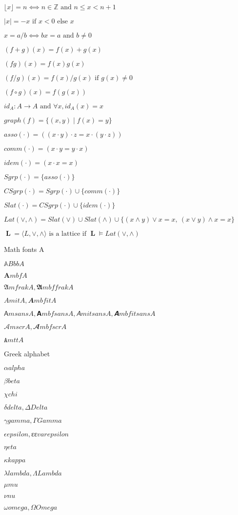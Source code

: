 \documentclass{article}
\begin{document}
$⌊x⌋ = n ⟺ n ∈ ℤ \text{ and } n ≤ x < n+1$

$|x| = −x \text{ if } x < 0 \text{ else } x$

$x = a/b ⟺ bx = a \text{ and } b ≠ 0$

$(f+g)(x) = f(x) + g(x)$

$(fg)(x) = f(x)g(x)$

$(f/g)(x) = f(x)/g(x) \text{ if } g(x) ≠ 0$

$(f∘g)(x) = f(g(x))$

$id_A : A → A \text{ and } ∀x, id_A(x) = x$

$graph(f) = \{(x,y) ∣ f(x) = y\}$

$asso(\cdot) = ((x\cdot y)\cdot z=x\cdot (y\cdot z))$

$comm(\cdot) = (x\cdot y=y\cdot x)$

$idem(\cdot) = (x\cdot x=x)$

$Sgrp(\cdot) = \{asso(\cdot)\}$

$CSgrp(\cdot) = Sgrp(\cdot)\cup \{comm(\cdot)\}$

$Slat(\cdot) = CSgrp(\cdot)\cup\{idem(\cdot)\}$

$Lat(\vee,\wedge) = Slat(\vee) \cup Slat(\wedge) \cup 
\{(x\wedge y)\vee x=x,\ (x\vee y)\wedge x=x\}$

$\mbfL=\langle L,\vee,\wedge\rangle \text{ is a lattice if } \mbfL\models Lat(\vee,\wedge)$

Math fonts A

$𝔸 BbbA$

$𝐀 mbfA$

$𝔄 mfrakA, 𝕬 mbffrakA$

$𝐴 mitA, 𝑨 mbfitA$

$𝖠 msansA, 𝗔 mbfsansA, 𝘈 mitsansA, 𝘼 mbfitsansA$

$𝒜 mscrA, 𝓐 mbfscrA$

$𝙰 mttA$

Greek alphabet

$α alpha$

$β beta$

$χ chi$

$δ delta, Δ Delta$

$γ gamma, Γ Gamma$

$ϵ epsilon, ɛɛ varepsilon$

$η eta$

$κ kappa$

$λ lambda, Λ Lambda$

$μ mu$

$ν nu$

$ω omega, Ω Omega$
\end{document}
